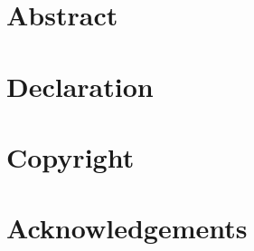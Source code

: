 

\maketitle

\section*{Abstract}

\section*{Declaration}

\section*{Copyright}

\section*{Acknowledgements}

\clearpage

\tableofcontents

\clearpage

\printacronyms[name=Acronyms and Abbreviations]

\listoffigures

\listoftables
